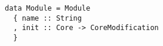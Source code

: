 \begin{verbatim}
data Module = Module
  { name :: String
  , init :: Core -> CoreModification
  }
\end{verbatim}
